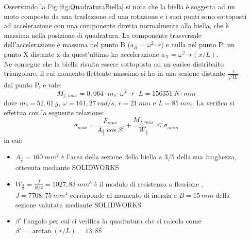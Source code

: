 Osservando la Fig.\ref{fig:QuadraturaBiella} si nota che la biella è soggetta ad un moto composto da una traslazione ed una rotazione e i suoi punti sono sottoposti ad accelerazione con una componente diretta normalmente alla biella, che è massima nella posizione di quadratura. La componente trasversale dell'accelerazione è massima nel punto B ($a_B=\omega^2\cdot r$) e nulla nel punto P; un punto X distante x da quest'ultimo ha accelerazione $a_X=\omega^2\cdot r\left(x/L\right)$.\\
Ne consegue che la biella risulta essere sottoposta ad un carico distribuito triangolare, il cui momento flettente massimo si ha in una sezione distante $\frac{1}{\sqrt{3L}}$ dal punto P, e vale:
\begin{equation}
    M_{f,max}=0,064\cdot m_b\cdot \omega^2\cdot r\cdot L=156351\ N\cdot mm
\end{equation}
dove $m_b=51,61\ g$, $\omega=161,27\ rad/s$, $r=21\ mm$ e $L=85\ mm$.
La verifica si effettua con la seguente relazione:
\begin{equation}
    \sigma_{max}=\frac{F_{max}}{A_{\frac{3}{5}}\cos \beta'}+\frac{M_{f,max}}{W_{\frac{3}{5}}}\le \sigma_{amm}
    \label{colpodifrusta}
\end{equation}
in cui:
\begin{itemize}
    \item $A_{\frac{3}{5}}=160\ mm^2$ è l'area della sezione della biella a 3/5 della sua lunghezza, ottenuta mediante SOLIDWORKS
    \item $W_{\frac{3}{5}}=\frac{J}{B/2}=1027,83\ mm^3$ è il modulo di resistenza a flessione , $J=7708,75\ mm^4$  corrisponde al momento di inerzia e $B=15\ mm$ della sezione valutata mediante SOLIDWORKS
    \item $\beta'$ l'angolo per cui si verifica la quadratura che si calcola come $\beta'=\arctan(r/L)=13,88^\circ$
\end{itemize}
